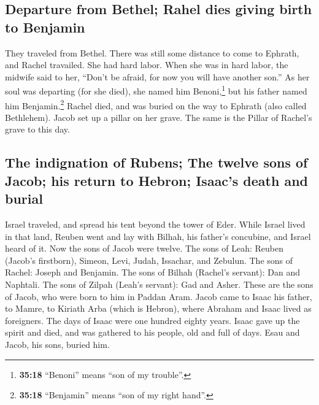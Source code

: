 \hypertarget{departure-from-bethel-rahel-dies-giving-birth-to-benjamin}{%
\subsection{Departure from Bethel; Rahel dies giving birth to
Benjamin}\label{departure-from-bethel-rahel-dies-giving-birth-to-benjamin}}

 They traveled from Bethel. There was still some distance
to come to Ephrath, and Rachel travailed. She had hard labor.
 When she was in hard labor, the midwife said to her,
``Don't be afraid, for now you will have another son.'' 
As her soul was departing (for she died), she named him
Benoni,\footnote{\textbf{35:18} ``Benoni'' means ``son of my trouble''.}
but his father named him Benjamin.\footnote{\textbf{35:18} ``Benjamin''
  means ``son of my right hand''.}  Rachel died, and was
buried on the way to Ephrath (also called Bethlehem). 
Jacob set up a pillar on her grave. The same is the Pillar of Rachel's
grave to this day.

\hypertarget{the-indignation-of-rubens-the-twelve-sons-of-jacob-his-return-to-hebron-isaacs-death-and-burial}{%
\subsection{The indignation of Rubens; The twelve sons of Jacob; his
return to Hebron; Isaac's death and
burial}\label{the-indignation-of-rubens-the-twelve-sons-of-jacob-his-return-to-hebron-isaacs-death-and-burial}}

 Israel traveled, and spread his tent beyond the tower of
Eder.  While Israel lived in that land, Reuben went and
lay with Bilhah, his father's concubine, and Israel heard of it. Now the
sons of Jacob were twelve.  The sons of Leah: Reuben
(Jacob's firstborn), Simeon, Levi, Judah, Issachar, and Zebulun.
 The sons of Rachel: Joseph and Benjamin. 
The sons of Bilhah (Rachel's servant): Dan and Naphtali. 
The sons of Zilpah (Leah's servant): Gad and Asher. These are the sons
of Jacob, who were born to him in Paddan Aram.  Jacob
came to Isaac his father, to Mamre, to Kiriath Arba (which is Hebron),
where Abraham and Isaac lived as foreigners.  The days of
Isaac were one hundred eighty years.  Isaac gave up the
spirit and died, and was gathered to his people, old and full of days.
Esau and Jacob, his sons, buried him.

